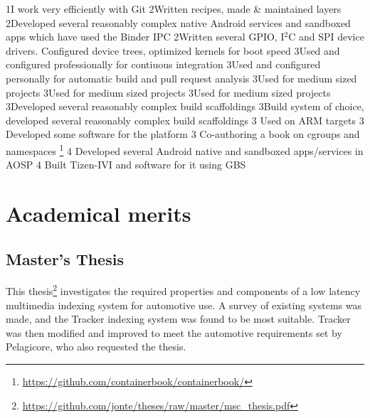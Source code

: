 \documentclass{twocolcv}
\begin{document}
 {
                {1}{I work very efficiently with Git}
              {2}{Written recipes, made \& maintained layers}
     {2}{Developed several reasonably complex native Android services and sandboxed apps which have used the Binder IPC}
       {2}{Written several GPIO, I$^2$C and SPI device drivers. Configured device trees, optimized kernels for boot speed}
            {3}{Used and configured professionally for contiuous integration }
          {3}{Used and configured personally for automatic build and pull request analysis }
            {3}{Used for medium sized projects}
               {3}{Used for medium sized projects}
             {3}{Used for medium sized projects}
           {3}{Developed several reasonably complex build scaffoldings}
              {3}{Build system of choice, developed several reasonably complex build scaffoldings}
             {3} {Used on ARM targets}
          {3} {Developed some software for the platform}
        {3} {Co-authoring a book on cgroups and namespaces \footnote{\url{https://github.com/containerbook/containerbook/}}}
       {4} {Developed several Android native and sandboxed apps/services in AOSP}
     {4} {Built Tizen-IVI and software for it using GBS}
}

\section*{Academical merits}

  \subsection*{Master's Thesis}
This thesis\footnote{\url{https://github.com/jonte/theses/raw/master/msc_thesis.pdf}} investigates the required properties and components of a low latency multimedia indexing system for automotive use. A survey of existing systems was made, and the Tracker indexing system was found to be most suitable. Tracker was then modified and improved to meet the automotive requirements set by Pelagicore, who also requested the thesis.
\end{document}
